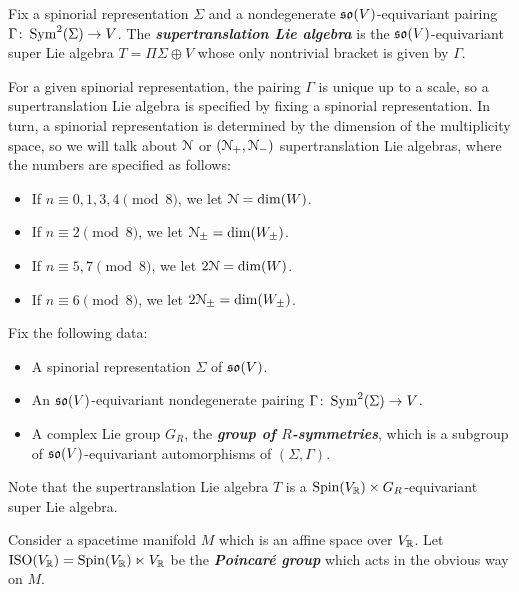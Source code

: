 \documentclass[10pt, oneside]{article}
\newcommand{\defterm}[1]{\textbf{\emph{#1}}}
\begin{document}
\begin{definition}
Fix a spinorial representation $\Sigma$ and a nondegenerate $\mathfrak{so}(V)$-equivariant pairing $\Gamma\colon \operatorname{Sym}^2(\Sigma)\rightarrow V$. The \defterm{supertranslation Lie algebra} is the $\mathfrak{so}(V)$-equivariant super Lie algebra $T=\Pi\Sigma\oplus V$ whose only nontrivial bracket is given by $\Gamma$.
\end{definition}

For a given spinorial representation, the pairing $\Gamma$ is unique up to a scale, so a supertranslation Lie algebra is specified by fixing a spinorial representation. In turn, a spinorial representation is determined by the dimension of the multiplicity space, so we will talk about $\mathcal{N}$ or $(\mathcal{N}_+, \mathcal{N}_-)$ supertranslation Lie algebras, where the numbers are specified as follows:
\begin{itemize}
\item If $n\equiv 0, 1, 3, 4\pmod 8$, we let $\mathcal{N} = \dim(W)$.

\item If $n\equiv 2 \pmod 8$, we let $\mathcal{N}_{\pm}=\dim(W_{\pm})$.

\item If $n\equiv 5, 7\pmod 8$, we let $2\mathcal{N} = \dim(W)$.

\item If $n\equiv 6\pmod 8$, we let $2\mathcal{N}_{\pm} = \dim(W_{\pm})$.
\end{itemize}

Fix the following data:
\begin{itemize}
\item A spinorial representation $\Sigma$ of $\mathfrak{so}(V)$.

\item An $\mathfrak{so}(V)$-equivariant nondegenerate pairing $\Gamma\colon \operatorname{Sym}^2(\Sigma)\rightarrow V$.

\item A complex Lie group $G_R$, the \defterm{group of $R$-symmetries}, which is a subgroup of $\mathfrak{so}(V)$-equivariant automorphisms of $(\Sigma, \Gamma)$.
\end{itemize}

Note that the supertranslation Lie algebra $T$ is a $\mathrm{Spin}(V_\mathbb R)\times G_R$-equivariant super Lie algebra.

Consider a spacetime manifold $M$ which is an affine space over $V_\mathbb R$. Let $\mathrm{ISO}(V_\mathbb R) = \mathrm{Spin}(V_\mathbb R)\ltimes V_\mathbb R$ be the \defterm{Poincar\'{e} group} which acts in the obvious way on $M$.
\end{document}
